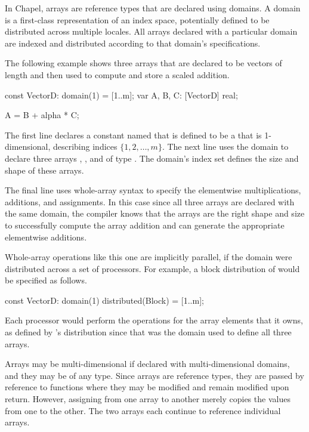 In Chapel, arrays are reference types that are declared using domains.
A domain is a first-class representation of an index space, potentially 
defined to be distributed across multiple locales.   All arrays
declared with a particular domain are indexed and distributed according 
to that domain's specifications.  

The following example shows three arrays that are declared to be
vectors of length  and then used to compute and store a 
scaled addition.
\begin{chapel}
const VectorD: domain(1) = [1..m];
var A, B, C: [VectorD] real;

A = B + alpha * C;
\end{chapel}
The first line declares a constant named  that
is defined to be a  that is  
1-dimensional, describing indices $\{ 1, 2, \ldots, m \}$.
The next line uses the  domain to declare three
arrays , , and  of type .  The
domain's index set defines the size and shape of these arrays. 

The final line uses whole-array syntax to specify the elementwise 
multiplications, additions, and assignments.  In this case since
all three arrays are declared with the same domain, the compiler
knows that the arrays are the right shape and size to successfully
compute the array addition and can generate the appropriate elementwise
additions.

Whole-array operations like this one are implicitly parallel, if the 
domain were distributed across a set of processors.  For example, 
a block distribution of  would be specified as follows.    
\begin{chapel}
const VectorD: domain(1) distributed(Block) = [1..m];
\end{chapel}
Each processor would perform the operations for the array elements that it owns, 
as defined by 's distribution since that was the domain
used to define all three arrays.

Arrays may be multi-dimensional if declared with multi-dimensional domains,
and they may be of any type.  
Since arrays are reference types, they are passed by reference to functions
where they may be modified and remain modified upon return.  However, assigning
from one array to another merely copies the values from one to the other.  The
two arrays each continue to reference individual arrays. 

